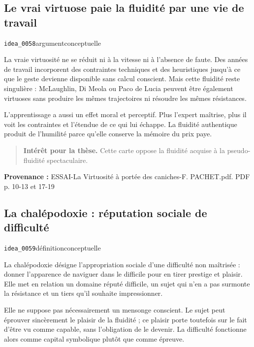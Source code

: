 \documentclass[10pt,a4paper]{article}
\begin{document}
\subsection{Le vrai virtuose paie la fluidité par une vie de travail}
{\small\color{metadata} \texttt{idea\_0058}\quad\textbullet\quad argument\quad\textbullet\quad conceptuelle\par}

La vraie virtuosité ne se réduit ni à la vitesse ni à l'absence de faute. Des années de travail incorporent des contraintes techniques et des heuristiques jusqu'à ce que le geste devienne disponible sans calcul conscient. Mais cette fluidité reste singulière : McLaughlin, Di Meola ou Paco de Lucia peuvent être également virtuoses sans produire les mêmes trajectoires ni résoudre les mêmes résistances.

L'apprentissage a aussi un effet moral et perceptif. Plus l'expert maîtrise, plus il voit les contraintes et l'étendue de ce qui lui échappe. La fluidité authentique produit de l'humilité parce qu'elle conserve la mémoire du prix paye.

\begin{quote}
\textbf{Intérêt pour la thèse.} Cette carte oppose la fluidité acquise à la pseudo-fluidité spectaculaire.
\end{quote}
{\footnotesize\color{metadata}\textbf{Provenance :} ESSAI-La Virtuosité à portée des caniches-F. PACHET.pdf. PDF p. 10-13 et 17-19\par}

\subsection{La chalépodoxie : réputation sociale de difficulté}
{\small\color{metadata} \texttt{idea\_0059}\quad\textbullet\quad définition\quad\textbullet\quad conceptuelle\par}

La chalépodoxie désigne l'appropriation sociale d'une difficulté non maîtrisée : donner l'apparence de naviguer dans le difficile pour en tirer prestige et plaisir. Elle met en relation un domaine réputé difficile, un sujet qui n'en a pas surmonte la résistance et un tiers qu'il souhaite impressionner.

Elle ne suppose pas nécessairement un mensonge conscient. Le sujet peut éprouver sincèrement le plaisir de la fluidité ; ce plaisir porte toutefois sur le fait d'être vu comme capable, sans l'obligation de le devenir. La difficulté fonctionne alors comme capital symbolique plutôt que comme épreuve.
\end{document}
